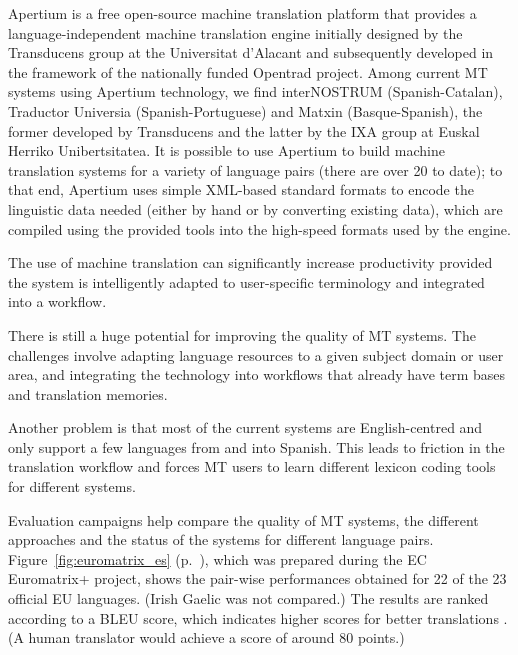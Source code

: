 \begin{multicols}{2}
Apertium is a free open-source machine translation platform that provides a language-independent machine translation engine initially designed by the Transducens group at the Universitat d'Alacant and subsequently developed in the framework of  the nationally funded Opentrad project. Among current MT systems using Apertium technology, we find interNOSTRUM (Spanish-Catalan), Traductor Universia (Spanish-Portuguese) and Matxin (Basque-Spanish), the former developed by Transducens and the latter by the IXA group  at Euskal Herriko Unibertsitatea. It is possible to use Apertium to build machine translation systems for a variety of language pairs (there are over 20 to date); to that end, Apertium uses simple XML-based standard formats to encode the linguistic data needed (either by hand or by converting existing data), which are compiled using the provided tools into the high-speed formats used by the engine.


The use of machine translation can significantly increase productivity provided the system is intelligently adapted to user-specific terminology and integrated into a workflow. 

There is still a huge potential for improving the quality of MT systems. The challenges involve adapting language resources to a given subject domain or user area, and integrating the technology into workflows that already have term bases and translation memories.

Another problem is that most of the current systems are English-centred and only support a few languages from and into Spanish. This leads to friction in the translation workflow and forces MT users to learn different lexicon coding tools for different systems.

Evaluation campaigns help compare the quality of MT systems, the different approaches and the status of the systems for different language pairs. Figure~\ref{fig:euromatrix_es} (p.~\pageref{fig:euromatrix_es}), which was prepared during the EC Euromatrix+ project, shows the pair-wise performances obtained for 22 of the 23 official EU languages. (Irish Gaelic was not compared.) The results are ranked according to a BLEU score, which indicates higher scores for better translations \cite{bleu1}. (A human translator would achieve a score of around 80 points.) 


\end{multicols}
